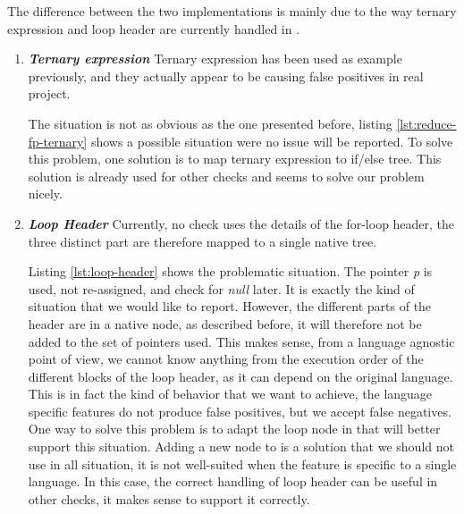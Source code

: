 The difference between the two implementations is mainly due to the way ternary expression and loop header are currently handled in \slang{}.
\begin{enumerate}
	\item \textbf{\textit{Ternary expression}} \newline 
	\label{subsubsec:reducing_false_positive_ternary}
	Ternary expression has been used as example previously, and they actually appear to be causing false positives in real project.
	
	
	
	The situation is not as obvious as the one presented before, listing \ref{lst:reduce-fp-ternary} shows a possible situation were no issue will be reported. 
	To solve this problem, one solution is to map ternary expression to if/else tree.
	This solution is already used for other checks and seems to solve our problem nicely.
	
	\item \textbf{\textit{Loop Header}} \newline 	
	\label{subsubsec:loop_header}
	Currently, no check uses the details of the for-loop header, the three distinct part are therefore mapped to a single native tree. 
	
	
	
	Listing \ref{lst:loop-header} shows the problematic situation. 
	The pointer \emph{p} is used, not re-assigned, and check for \emph{null} later. 
	It is exactly the kind of situation that we would like to report. 
	However, the different parts of the header are in a native node, as described before, it will therefore not be added to the set of pointers used.
	This makes sense, from a language agnostic point of view, we cannot know anything from the execution order of the different blocks of the loop header, as it can depend on the original language.
	This is in fact the kind of behavior that we want to achieve, the language specific features do not produce false positives, but we accept false negatives.
	One way to solve this problem is to adapt the loop node in \slang{} that will better support this situation.
	Adding a new node to \slang{} is a solution that we should not use in all situation, it is not well-suited when the feature is specific to a single language.
	In this case, the correct handling of loop header can be useful in other checks, it makes sense to support it correctly.
\end{enumerate}

